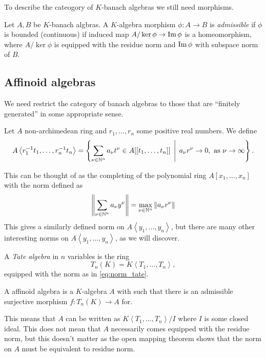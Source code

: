 To describe the cateogory of $K$-banach algebras we still need morphisms.
\begin{definition}
	Let $A, B$ be $K$-banach algbras. 
	A $K$-algebra morphism $\phi: A \to B$ is \emph{admissible} if $\phi$ is bounded (continuous) if induced map $A / \ker \phi \to \operatorname{Im} \phi$ is a homeomorphism, where $A / \ker \phi$ is equipped with the residue norm and $\operatorname{Im} \phi$ with subspace norm of $B$. 
\end{definition}


\subsection{Affinoid algebras} \label{sec:affinoid_algebras}
We need restrict the category of banach algebras to those that are ``finitely generated'' in some appropriate sense. 

\begin{definition}
	Let $A$ non-archimedean ring and $r_1, \ldots, r_n$ some positive real numbers. We define \[
		A \left<r_1^{-1}t_1, \ldots, r_{n}^{-1} t_n \right> = \left\{\sum_{\nu \in \N^{n}}^{} a_\nu t^{\nu} \in A[[t_1,\ldots, t_n]]\st a_\nu r^{\nu} \to 0, \text{ as } \nu \to \infty\right\} 
	.\] 
\end{definition}
This can be thought of as the completing of the polynomial ring $A[x_1, \ldots, x_n]$ with the norm defined as 
\begin{equation}\label{eq:norm_tate}
	\left\| \sum_{\nu \in \mathbb{N}^{n}} a_\nu y^{\nu}\right\| = \max_{\nu \in \mathbb{N}^{n}} \|a_\nu r^{\nu}\|
\end{equation}
This gives a similarly defined norm on $A\left<y_1, \ldots, y_n \right>$, but there are many other interesting norms on $A \left<y_1, \ldots, y_n \right>$, as we will discover. 

\begin{definition}
	A \emph{Tate algebra} in $n$ variables is the ring \[
		T_n(K) = K\left<T_1, \ldots, T_n \right>
	,\]
	equipped with the norm as in \eqref{eq:norm_tate}.
\end{definition}


\begin{definition}
	A affinoid algebra is a $K$-algebra $A$ with such that there is an admissible surjective morphism $f: T_n(K) \to A$ for. 
\end{definition}
This means that $A$ can be written as $K\left<T_1, \ldots, T_n \right> / I$ where $I$ is some closed ideal.
This does not mean that $A$ necessarily comes equipped with the residue norm, but this doesn't matter as the open mapping theorem shows that the norm on $A$ must be equivalent to residue norm.
